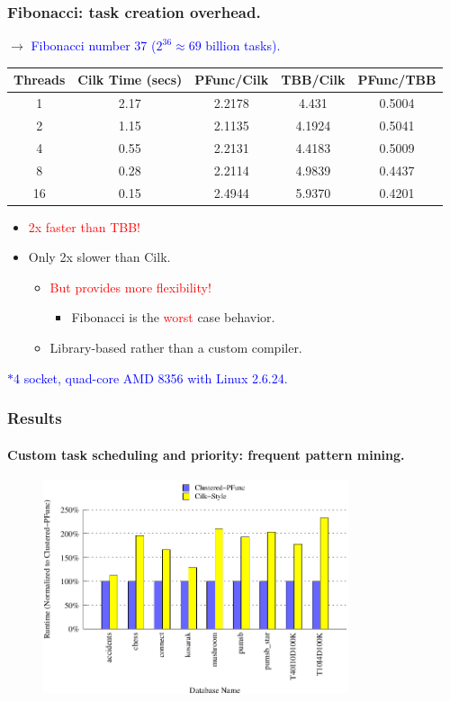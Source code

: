 \documentclass{beamer}
\newcommand{\tablefont}{\fontsize{8}{13}\selectfont}
\begin{document}
\begin{frame}[fragile]
\frametitle{Fibonacci: task creation overhead.}
$\rightarrow{}$ \textcolor{blue}{Fibonacci number 37 ($2^{36}\approx{}69$ billion tasks).}
\tablefont
\begin{center}
\begin{tabular}{|c|c|c|c|c|} 
\hline
Threads & Cilk Time (secs) & PFunc/Cilk & TBB/Cilk & PFunc/TBB \\
\hline
1  & 2.17 & 2.2178  & 4.431 & 0.5004 \\ 
\hline
2  & 1.15 & 2.1135 & 4.1924 & 0.5041 \\ 
\hline
4  & 0.55 & 2.2131 & 4.4183 & 0.5009 \\ 
\hline
8  & 0.28 & 2.2114 & 4.9839 & 0.4437 \\ 
\hline
16 & 0.15 & 2.4944 & 5.9370 & 0.4201 \\ 
\hline
\end{tabular}
\end{center}
\normalsize
\begin{itemize}
\item \textcolor{red}{2x faster than TBB!}
\item Only 2x slower than Cilk.
  \begin{itemize}
  \item \textcolor{red}{But provides more flexibility!}
    \begin{itemize}
    \item Fibonacci is the \textcolor{red}{worst} case behavior.
    \end{itemize}
  \item Library-based rather than a custom compiler.
  \end{itemize}
\end{itemize}
\tiny\textcolor{blue}{$\ast{}$4 socket, quad-core AMD 8356 with Linux 2.6.24.}\normalsize
\end{frame}

\begin{frame}[fragile]
\frametitle{Results}
\framesubtitle{Custom task scheduling and priority: frequent pattern mining.}
\begin{figure}
\includegraphics[width=0.8\textwidth]{figs/fim_8}
\label{fig:fim}
\end{figure}
\end{frame}
\end{document}
